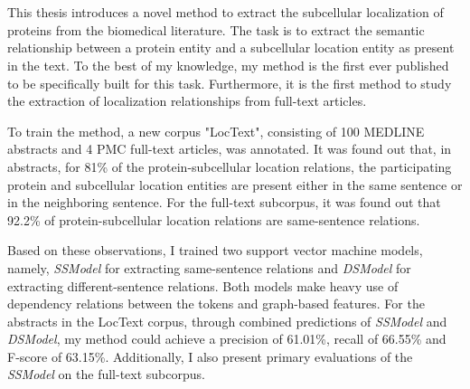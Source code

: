 \chapter{\abstractname}

This thesis introduces a novel method to extract the subcellular localization of proteins from the biomedical literature. The task is to extract the semantic relationship between a protein entity and a subcellular location entity as present in the text. To the best of my knowledge, my method is the first ever published to be specifically built for this task. Furthermore, it is the first method to study the extraction of localization relationships from full-text articles.

To train the method, a new corpus "LocText", consisting of 100 MEDLINE abstracts and 4 PMC full-text articles, was annotated. It was found out that, in abstracts, for 81\% of the protein-subcellular location relations, the participating protein and subcellular location entities are present either in the same sentence or in the neighboring sentence. For the full-text subcorpus, it was found out that 92.2\% of protein-subcellular location relations are same-sentence relations.


Based on these observations, I trained two support vector machine models, namely, \textit{SSModel} for extracting same-sentence relations and \textit{DSModel} for extracting different-sentence relations. Both models make heavy use of dependency relations between the tokens and graph-based features. For the abstracts in the LocText corpus, through combined predictions of \textit{SSModel} and \textit{DSModel}, my method could achieve a precision of 61.01\%, recall of 66.55\% and F-score of 63.15\%. Additionally, I also present primary evaluations of the \textit{SSModel} on the full-text subcorpus.